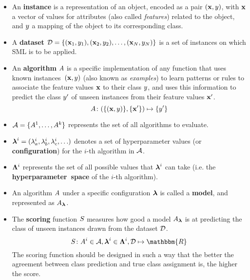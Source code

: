 	\begin{itemize}
		\item
		An {\bf instance} is a representation of an object, encoded as a pair $(\mathbf{x}, y)$,
		with $\mathbf{x}$ a vector of values for attributes (also called \emph{features}) related to
		the object, and $y$ a mapping of the object to its corresponding class.
		
		\item
		A {\bf dataset} $\mathcal{D} = \{(\mathbf{x}_1, y_1), (\mathbf{x}_2, y_2), \ldots,
		(\mathbf{x}_N, y_N)\}$ is a set of instances on which SML is to be applied.

		\item
		An {\bf algorithm} $A$ is a specific implementation of any function that uses known
		instances~$(\mathbf{x}, y)$ (also known as \emph{examples}) to learn patterns or rules to
		associate the feature values $\mathbf{x}$ to their class $y$, and uses this
		information to predict the class $y'$ of unseen instances from their feature values
		$\mathbf{x}'$.
		\begin{equation}
			A \colon (\{(\mathbf{x}, y)\}, \{\mathbf{x}'\}) \mapsto \{y'\}
		\end{equation}

		\item
		$\mathcal{A} = \{A^1, \ldots, A^k\}$ represents the set of all algorithms to evaluate.
		
		\item
		$\boldsymbol{\lambda}^i = (\lambda^i_a, \lambda^i_b, \lambda^i_c,\ldots)$ denotes a set of
		hyperparameter values (or {\bf configuration}) for the $i$-th algorithm in $\mathcal{A}$.
		
		\item
		$\mathbf{\Lambda}^i$ represents the set of all possible values that $\boldsymbol{\lambda}^i$ can take (i.e. the
		{\bf hyperparameter~space} of the $i$-th algorithm).

		\item
		An algorithm $A$ under a specific configuration $\boldsymbol{\lambda}$ is called a {\bf model}, and
		represented as $A_{\boldsymbol{\lambda}}$.

		\item
		The {\bf scoring} function $S$ measures how good a model $A_{\boldsymbol{\lambda}}$ is at
		predicting the class of unseen instances drawn from the dataset
		$\mathcal{D}$.
		\begin{equation}
			\Score \colon \algo^i \in \algoset, \param^i \in \paramspace^i, \alldata \mapsto
			\mathbbm{R}
		\end{equation}
		The scoring function should be designed in such a way that the better the agreement between
		class prediction and true class assignment is, the higher the score.
	\end{itemize}


